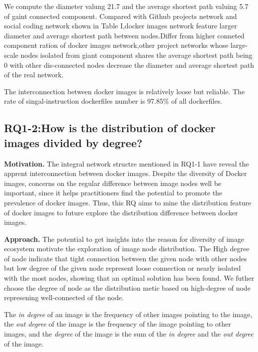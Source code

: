 \documentclass[sigconf]{acmart}
\begin{document}
We compute the diameter valung 21.7 and the average shortest path valuing 5.7 of gaint connected component. Compared with Github projects network and social coding network shown in Table I,docker images network feature larger diameter and average shortest path between nodes.Differ from higher conneted component ration of docker images network,other project networks whose large-scale nodes isolated from giant component shares the average shortest path being 0 with other dis-connected nodes decrease the diameter and average shortest path of the real network.

\begin{mybox}
The interconnection between docker images is relatively loose but reliable. The rate of singal-instruction dockerfiles number is 97.85\% of all dockerfiles.
\end{mybox}


\subsection{RQ1-2:How is the distribution of docker images divided by degree?}
\noindent\textbf{Motivation. }The integral network structre mentioned in RQ1-1 have reveal the apprent interconnection between docker images. Despite the diversity of Docker images, concerns on the regular difference between image nodes well be important, since it helps practitioners find the potential to promote the prevalence of docker images. Thus, this RQ aims to mine the distribution feature of docker images to future explore the distribution difference between docker images.

\noindent\textbf{Approach. }The potential to get insights into the reason for diversity of image ecosystem motivate the exploration of image node distribution. The High degree of node indicate that tight connection between the given node with other nodes but low degree of the given node represent loose connection or nearly isolated with the most nodes, showing that an optimal solution has been found. We futher choose the degree of node as the distribution metic based on high-degree of node represening well-connected of the node. 

The \emph{in degree} of an image is the frequency of other images pointing to the image, the \emph{out degree} of the image is the frequency of the image pointing to other images, and the \emph{degree} of the image is the sum of the \emph{in degree} and the \emph{out degree} of the image.
\end{document}
